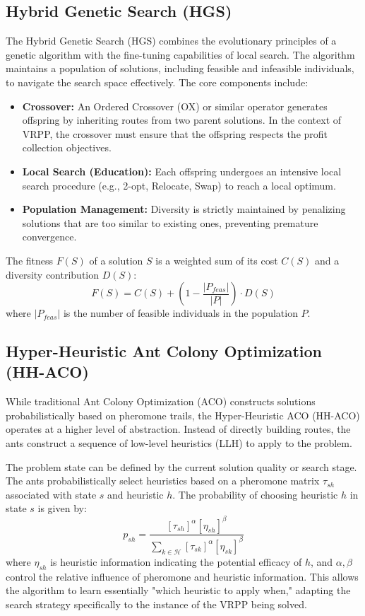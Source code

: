 \documentclass[orivec,runningheads]{llncs}
\begin{document}
\begin{center}
\begin{longtable}
\subsection{Hybrid Genetic Search (HGS)}
The Hybrid Genetic Search (HGS) combines the evolutionary principles of a genetic algorithm with the fine-tuning capabilities of local search. The algorithm maintains a population of solutions, including feasible and infeasible individuals, to navigate the search space effectively. The core components include:
\begin{itemize}
    \item \textbf{Crossover:} An Ordered Crossover (OX) or similar operator generates offspring by inheriting routes from two parent solutions. In the context of VRPP, the crossover must ensure that the offspring respects the profit collection objectives.
    \item \textbf{Local Search (Education):} Each offspring undergoes an intensive local search procedure (e.g., 2-opt, Relocate, Swap) to reach a local optimum.
    \item \textbf{Population Management:} Diversity is strictly maintained by penalizing solutions that are too similar to existing ones, preventing premature convergence.
\end{itemize}
The fitness $F(S)$ of a solution $S$ is a weighted sum of its cost $C(S)$ and a diversity contribution $D(S)$:
\begin{equation}
    F(S) = C(S) + (1 - \frac{|P_{feas}|}{|P|}) \cdot D(S)
\end{equation}
where $|P_{feas}|$ is the number of feasible individuals in the population $P$.

\subsection{Hyper-Heuristic Ant Colony Optimization (HH-ACO)}
While traditional Ant Colony Optimization (ACO) constructs solutions probabilistically based on pheromone trails, the Hyper-Heuristic ACO (HH-ACO) operates at a higher level of abstraction. Instead of directly building routes, the ants construct a sequence of low-level heuristics (LLH) to apply to the problem.

The problem state can be defined by the current solution quality or search stage. The ants probabilistically select heuristics based on a pheromone matrix $\tau_{sh}$ associated with state $s$ and heuristic $h$. The probability of choosing heuristic $h$ in state $s$ is given by:
\begin{equation}
    p_{sh} = \frac{[\tau_{sh}]^\alpha [\eta_{sh}]^\beta}{\sum_{k \in \mathcal{H}} [\tau_{sk}]^\alpha [\eta_{sk}]^\beta}
\end{equation}
where $\eta_{sh}$ is heuristic information indicating the potential efficacy of $h$, and $\alpha, \beta$ control the relative influence of pheromone and heuristic information. This allows the algorithm to learn essentially "which heuristic to apply when," adapting the search strategy specifically to the instance of the VRPP being solved.


\end{longtable}
\end{center}
\end{document}
